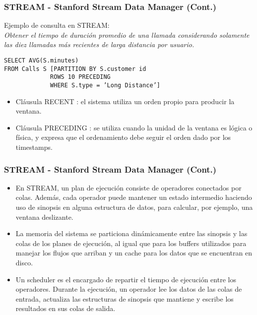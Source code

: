 \begin{frame}[fragile]
\frametitle{STREAM - Stanford Stream Data Manager (Cont.)}
Ejemplo de consulta en STREAM:\\
\textit{Obtener el tiempo de duración promedio de una llamada considerando solamente las diez llamadas más recientes de larga distancia por usuario.} 

\begin{verbatim}
SELECT AVG(S.minutes)
FROM Calls S [PARTITION BY S.customer id
             ROWS 10 PRECEDING
             WHERE S.type = ’Long Distance’]
\end{verbatim}
\begin{itemize}
\item Cláusula RECENT : el sistema utiliza un orden propio para producir la ventana.
\item Cláusula PRECEDING : se utiliza cuando la unidad de la ventana es lógica o física, y expresa que el ordenamiento debe seguir el orden dado por los timestamps.
\end{itemize}
\end{frame}

\begin{frame}
\frametitle{STREAM - Stanford Stream Data Manager (Cont.)}
\begin{itemize}
\item En STREAM, un plan de ejecución consiste de operadores conectados por colas. Además, cada operador puede mantener un estado intermedio haciendo uso de sinopsis en alguna estructura de datos, para calcular, por ejemplo, una ventana deslizante.
\item La memoria del sistema se particiona dinámicamente entre las sinopsis y las colas de los planes de ejecución, al igual que para los buffers utilizados para manejar los flujos que arriban y un cache para los datos que se encuentran en disco.
\item Un scheduler es el encargado de repartir el tiempo de ejecución entre los operadores. Durante la ejecución, un operador lee los datos de las colas de entrada, actualiza las estructuras de sinopsis que mantiene y escribe los resultados en sus colas de salida.
\end{itemize}
\end{frame}

